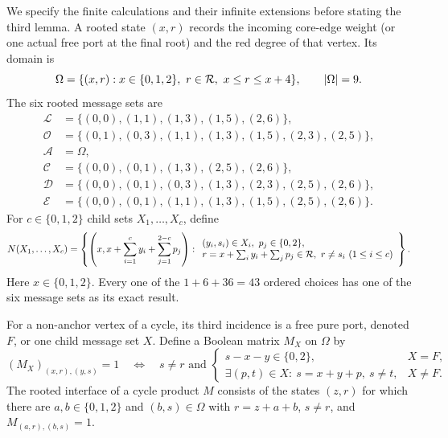 We specify the finite calculations and their infinite extensions before
stating the third lemma.  A rooted state $(x,r)$ records the incoming
core-edge weight (or one actual free port at the final root) and the red
degree of that vertex.  Its domain is
\begin{equation}\label{eq:Omega}
 \Omega=\{(x,r):x\in\{0,1,2\},\ r\in\mathcal R,\ x\le r\le x+4\},
 \qquad |\Omega|=9.
\end{equation}
The six rooted message sets are
\begin{align*}
 \mathcal L&=\{(0,0),(1,1),(1,3),(1,5),(2,6)\},\\
 \mathcal O&=\{(0,1),(0,3),(1,1),(1,3),(1,5),(2,3),(2,5)\},\\
 \mathcal A&=\Omega,\\
 \mathcal C&=\{(0,0),(0,1),(1,3),(2,5),(2,6)\},\\
 \mathcal D&=\{(0,0),(0,1),(0,3),(1,3),(2,3),(2,5),(2,6)\},\\
 \mathcal E&=\{(0,0),(0,1),(1,1),(1,3),(1,5),(2,5),(2,6)\}.
\end{align*}
For $c\in\{0,1,2\}$ child sets $X_1,\ldots,X_c$, define
\begin{equation}\label{eq:node}
 N(X_1,\ldots,X_c)=
 \left\{\left(x,x+\sum_{i=1}^c y_i+\sum_{j=1}^{2-c}p_j\right):
 \begin{array}{l}
 (y_i,s_i)\in X_i,\ p_j\in\{0,2\},\\
 r=x+\sum_i y_i+\sum_jp_j\in\mathcal R,\ r\ne s_i\ (1\le i\le c)
 \end{array}\right\}.
\end{equation}
Here $x\in\{0,1,2\}$.  Every one of the $1+6+36=43$ ordered
choices has one of the six message sets as its exact result.

For a non-anchor vertex of a cycle, its third incidence is a free pure
port, denoted $F$, or one child message set $X$.  Define a Boolean matrix
$M_X$ on $\Omega$ by
\begin{equation}\label{eq:letter}
 (M_X)_{(x,r),(y,s)}=1
 \quad\Longleftrightarrow\quad
 s\ne r\text{ and }
 \begin{cases}
 s-x-y\in\{0,2\},&X=F,\\
 \exists(p,t)\in X:\ s=x+y+p,\ s\ne t,&X\ne F.
 \end{cases}
\end{equation}
The rooted interface of a cycle product $M$ consists of the states
$(z,r)$ for which there are $a,b\in\{0,1,2\}$ and $(b,s)\in\Omega$
with $r=z+a+b$, $s\ne r$, and $M_{(a,r),(b,s)}=1$.

